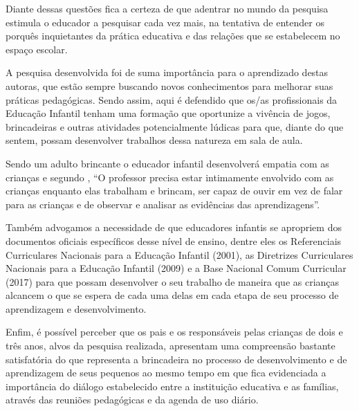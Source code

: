 \begin{refsection}
    Diante dessas questões fica a certeza de que adentrar no mundo da pesquisa estimula o educador a pesquisar cada vez mais, na tentativa de entender os porquês inquietantes da prática educativa e das relações que se estabelecem no espaço escolar. 

    A pesquisa desenvolvida foi de suma importância para o aprendizado destas autoras, que estão sempre buscando novos conhecimentos para melhorar suas práticas pedagógicas. Sendo assim, aqui é defendido que os/as profissionais da Educação Infantil tenham uma formação que oportunize a vivência de jogos, brincadeiras e outras atividades potencialmente lúdicas para que, diante do que sentem, possam desenvolver trabalhos dessa natureza em sala de aula. 

    Sendo um adulto brincante o educador infantil desenvolverá empatia com as crianças e segundo \textcite[p.~90]{ANNING2005brincar}, “O professor precisa estar intimamente envolvido com as crianças enquanto elas trabalham e brincam, ser capaz de ouvir em vez de falar para as crianças e de observar e analisar as evidências das aprendizagens”. 

    Também advogamos a necessidade de que educadores infantis se apropriem dos documentos oficiais específicos desse nível de ensino, dentre eles os Referenciais Curriculares Nacionais para a Educação Infantil (2001), as Diretrizes Curriculares Nacionais para a Educação Infantil (2009) e a Base Nacional Comum Curricular (2017) para que possam desenvolver o seu trabalho de maneira que as crianças alcancem o que se espera de cada uma delas em cada etapa de seu processo de aprendizagem e desenvolvimento. 

    Enfim, é possível perceber que os pais e os responsáveis pelas crianças de dois e três anos, alvos da pesquisa realizada, apresentam uma compreensão bastante satisfatória do que representa a brincadeira no processo de desenvolvimento e de aprendizagem de seus pequenos ao mesmo tempo em que fica evidenciada a importância do diálogo estabelecido entre a instituição educativa e as famílias, através das reuniões pedagógicas e da agenda de uso diário. 

    \nocite{LDB1998}
    \nocite{MEC_SN_OQueVerificar}

    \printbibliography[heading=subbibliography,notcategory=fullcited]

    \label{chap:concepcao-pais-respoend}

\end{refsection}
